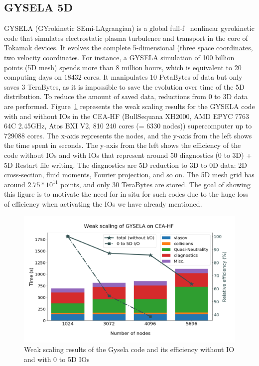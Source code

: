 \subsection{GYSELA 5D}
GYSELA (GYrokinetic SEmi-LAgrangian) is a global full-f~\cite{Garbet_2010} nonlinear gyrokinetic code that simulates electrostatic plasma turbulence and transport in the core of Tokamak devices. It evolves the complete 5-dimensional (three space coordinates, two velocity coordinates. 
For instance, a GYSELA simulation of 100 billion points (5D mesh) spends more than 8 million hours, which is equivalent to 20 computing days on $18 432$ cores. It manipulates 10 PetaBytes of data but only saves 3 TeraBytes, as it is impossible to save the evolution over time of the 5D distribution. To reduce the amount of saved data, reductions from 0 to 3D data are performed.   
Figure~\ref{fig:gys} represents the weak scaling results for the GYSELA code with and without IOs in the CEA-HF (BullSequana XH2000, AMD EPYC 7763 64C 2.45GHz, Atos BXI V2, 810 240 cores (= 6330 nodes)) supercomputer up to $729 088$ cores. The x-axis represents the nodes, and the y-axis from the left shows the time spent in seconds. The y-axis from the left shows the efficiency of the code without IOs and with IOs that represent  around 50 diagnostics (0 to 3D) + 5D Restart file writing. The diagnostics are 5D reduction to 3D to 0D data: 2D cross-section, fluid moments, Fourier projection, and so on.
The 5D mesh grid has around $2.75*10^{11}$ points, and only 30 TeraBytes are stored. 
The goal of showing this figure is to motivate the need for in situ for such codes due to the huge loss of efficiency when activating the IOs we have already mentioned\cite{grandgirard:cea-03740685}. 

\begin{figure}[ht]\centering
\includegraphics[width=0.8\columnwidth]{figures/gysela.png}
\caption{Weak scaling results of the Gysela code and its efficiency without IO and with 0 to 5D IOs~\cite{grandgirard:cea-03740685}}
\label{fig:gys}
\end{figure}

